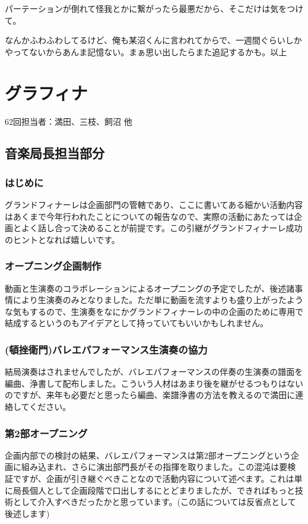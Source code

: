\documentclass[dvipdfmx,jb5]{jreport}
\begin{document}
パーテーションが倒れて怪我とかに繋がったら最悪だから、そこだけは気をつけて。

なんかふわふわしてるけど、俺も某沼くんに言われてからで、一週間ぐらいしかやってないからあんま記憶ない。まぁ思い出したらまた追記するかも。以上




\section{グラフィナ}\label{sec:グラフィナ}
62回担当者：満田、三枝、飼沼 他
\subsection{音楽局長担当部分}
\subsubsection{はじめに}
グランドフィナーレは企画部門の管轄であり、ここに書いてある細かい活動内容はあくまで今年行われたことについての報告なので、実際の活動にあたっては企画とよく話し合って決めることが前提です。この引継がグランドフィナーレ成功のヒントとなれば嬉しいです。
\subsubsection{オープニング企画制作}
動画と生演奏のコラボレーションによるオープニングの予定でしたが、後述諸事情により生演奏のみとなりました。ただ単に動画を流すよりも盛り上がったような気もするので、生演奏をなにかグランドフィナーレの中の企画のために専用で結成するというのもアイデアとして持っていてもいいかもしれません。
\subsubsection{(頓挫衛門)バレエパフォーマンス生演奏の協力}
結局演奏はされませんでしたが、バレエパフォーマンスの伴奏の生演奏の譜面を編曲、浄書して配布しました。こういう人材はあまり後を継がせるつもりはないのですが、来年も必要だと思ったら編曲、楽譜浄書の方法を教えるので満田に連絡してください。
\subsubsection{第2部オープニング}
企画内部での検討の結果、バレエパフォーマンスは第2部オープニングという企画に組み込まれ、さらに演出部門長がその指揮を取りました。この混沌は要検証ですが、企画が引き継ぐべきことなので活動内容について述べます。これは単に局長個人として企画段階で口出しするにとどまりましたが、できればもっと技術として介入すべきだったかと思っています。(この話については反省点として後述します)
\end{document}

